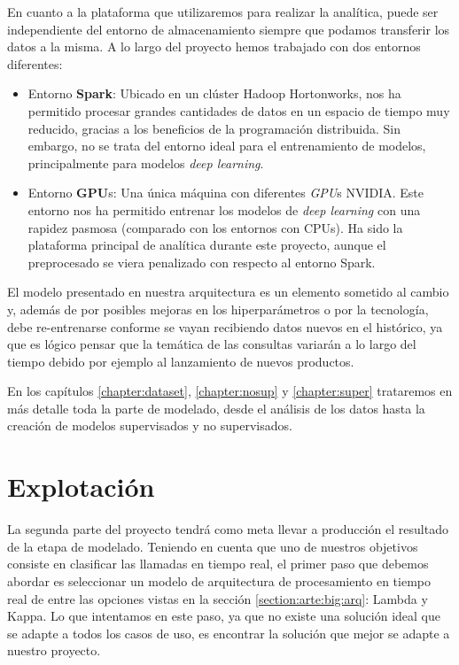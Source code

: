 En cuanto a la plataforma que utilizaremos para realizar la analítica, puede ser independiente del entorno de almacenamiento siempre que podamos transferir los datos a la misma. A lo largo del proyecto hemos trabajado con dos entornos diferentes: 

\begin{itemize}
\item Entorno \textbf{Spark}: Ubicado en un clúster Hadoop Hortonworks, nos ha permitido procesar grandes cantidades de datos en un espacio de tiempo muy reducido, gracias a los beneficios de la programación distribuida. Sin embargo, no se trata del entorno ideal para el entrenamiento de modelos, principalmente para modelos  \textit{deep learning}.

\item Entorno \textbf{GPU}s: Una única máquina con diferentes \textit{GPU}s NVIDIA. Este entorno nos ha permitido entrenar los modelos de \textit{deep learning} con una rapidez pasmosa (comparado con los entornos con CPUs). Ha sido la plataforma principal de analítica durante este proyecto, aunque el preprocesado se viera penalizado con respecto al entorno Spark.


\end{itemize}
 

El modelo presentado en nuestra arquitectura es un elemento sometido al cambio y, además de por posibles mejoras en los hiperparámetros o por la tecnología, debe re-entrenarse conforme se vayan recibiendo datos nuevos en el histórico, ya que es lógico pensar que la temática de las consultas variarán a lo largo del tiempo debido por ejemplo al lanzamiento de nuevos productos. 


En los capítulos \ref{chapter:dataset}, \ref{chapter:nosup} y \ref{chapter:super} trataremos en más detalle toda la parte de modelado, desde el análisis de los datos hasta la creación de modelos supervisados y no supervisados.

\section{Explotación}
\label{section:arq:exp}
La segunda parte del proyecto tendrá como meta llevar a producción el resultado de la etapa de modelado. Teniendo en cuenta que uno de nuestros objetivos consiste en clasificar las llamadas en tiempo real,
el primer paso que debemos abordar es seleccionar un modelo de arquitectura de procesamiento en tiempo real de entre las opciones vistas en la sección \ref{section:arte:big:arq}: Lambda y Kappa. Lo que intentamos en este paso, ya que no existe una solución ideal que se adapte a todos los casos de uso, es encontrar la solución que mejor se adapte a nuestro proyecto.


